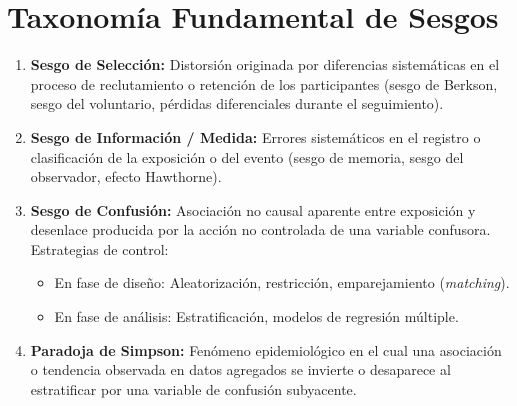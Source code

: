 \documentclass[11pt,a4paper]{report}
\theoremstyle{definition}
\begin{document}
\section{Taxonomía Fundamental de Sesgos}
\begin{enumerate}[leftmargin=*]
    \item \textbf{Sesgo de Selección:} Distorsión originada por diferencias sistemáticas en el proceso de reclutamiento o retención de los participantes (sesgo de Berkson, sesgo del voluntario, pérdidas diferenciales durante el seguimiento).
    \item \textbf{Sesgo de Información / Medida:} Errores sistemáticos en el registro o clasificación de la exposición o del evento (sesgo de memoria, sesgo del observador, efecto Hawthorne).
    \item \textbf{Sesgo de Confusión:} Asociación no causal aparente entre exposición y desenlace producida por la acción no controlada de una variable confusora. Estrategias de control:
    \begin{itemize}
        \item En fase de diseño: Aleatorización, restricción, emparejamiento (\emph{matching}).
        \item En fase de análisis: Estratificación, modelos de regresión múltiple.
    \end{itemize}
    \item \textbf{Paradoja de Simpson:} Fenómeno epidemiológico en el cual una asociación o tendencia observada en datos agregados se invierte o desaparece al estratificar por una variable de confusión subyacente.
\end{enumerate}
\end{document}
